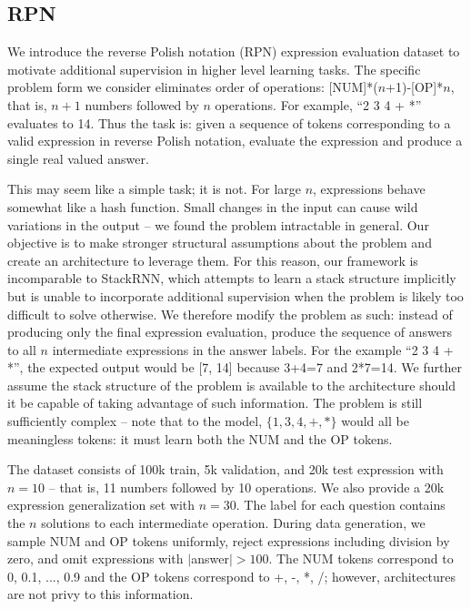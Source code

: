 \documentclass{article}
\begin{document}
\subsection{RPN}
We introduce the reverse Polish notation (RPN) expression evaluation dataset to motivate additional supervision in higher level learning tasks. The specific problem form we consider eliminates order of operations: [NUM]*($n$+1)-[OP]*$n$, that is, $n+1$ numbers followed by $n$ operations. For example, ``2 3 4 + *'' evaluates to 14. Thus the task is: given a sequence of tokens corresponding to a valid expression in reverse Polish notation, evaluate the expression and produce a single real valued answer.

This may seem like a simple task; it is not. For large $n$, expressions behave somewhat like a hash function. Small changes in the input can cause wild variations in the output -- we found the problem intractable in general. Our objective is to make stronger structural assumptions about the problem and create an architecture to leverage them. For this reason, our framework is incomparable to StackRNN, which attempts to learn a stack structure implicitly but is unable to incorporate additional supervision when the problem is likely too difficult to solve otherwise. We therefore modify the problem as such: instead of producing only the final expression evaluation, produce the sequence of answers to all $n$ intermediate expressions in the answer labels. For the example ``2 3 4 + *'', the expected output would be [7, 14] because 3+4=7 and 2*7=14. We further assume the stack structure of the problem is available to the architecture should it be capable of taking advantage of such information. The problem is still sufficiently complex -- note that to the model, $\{1, 3, 4, +, *\}$ would all be meaningless tokens: it must learn both the NUM and the OP tokens. 

The dataset consists of 100k train, 5k validation, and 20k test expression with $n=10$ -- that is, 11 numbers followed by 10 operations. We also provide a 20k expression generalization set with $n=30$. The label for each question contains the $n$ solutions to each intermediate operation. During data generation, we sample NUM and OP tokens uniformly, reject expressions including division by zero, and omit expressions with $|$answer$|>100$. The NUM tokens correspond to 0, 0.1, ..., 0.9 and the OP tokens correspond to +, -, *, /; however, architectures are not privy to this information.
\end{document}
